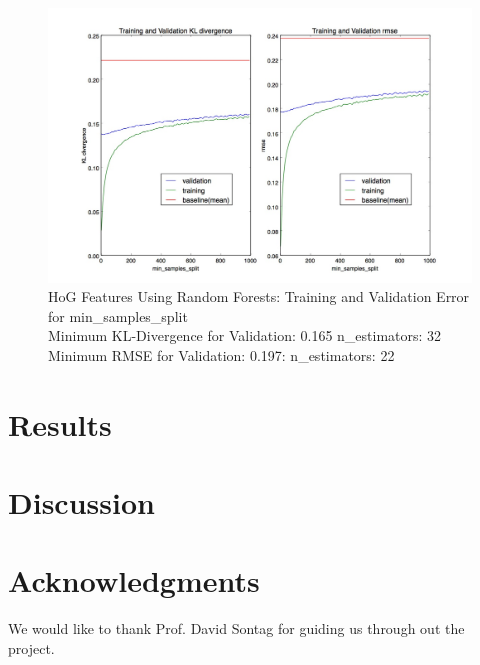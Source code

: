 \documentclass[10pt]{article}
\begin{document}
\begin{figure}
\begin{center}
\includegraphics[scale=0.4]{images/Raw_Features_Random_Forest_min_samples_split}
\caption{HoG Features Using Random Forests: Training and Validation Error for min\_samples\_split \\
         Minimum KL-Divergence for Validation: 0.165 n\_estimators: 32 \\
         Minimum RMSE for Validation: 0.197: n\_estimators: 22}
\label{fig:rawdreval}
\end{center}
\end{figure}

\section*{Results}

\section*{Discussion}

\section*{Acknowledgments}

We would like to thank Prof. David Sontag for guiding us through out the project.


\end{document}
